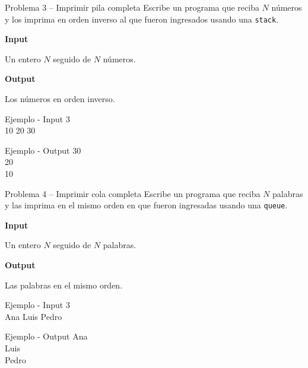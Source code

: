 \documentclass{article}
\begin{document}
\vspace{3.5em}


\begin{container}{Problema 3 – Imprimir pila completa}
Escribe un programa que reciba $N$ números y los imprima en orden inverso al que fueron ingresados usando una \texttt{stack}.
\end{container}

\textbf{Input}

Un entero $N$ seguido de $N$ números.

\vspace{0.5em}
\textbf{Output}

Los números en orden inverso.

\vspace{0.5em}

\begin{container}{Ejemplo - Input}
3 \\
10 20 30
\end{container}

\begin{container}{Ejemplo - Output}
30\\
20\\
10
\end{container}

\vspace{3.5em}


\begin{container}{Problema 4 – Imprimir cola completa}
Escribe un programa que reciba $N$ palabras y las imprima en el mismo orden en que fueron ingresadas usando una \texttt{queue}.
\end{container}

\textbf{Input}

Un entero $N$ seguido de $N$ palabras.

\vspace{0.5em}
\textbf{Output}

Las palabras en el mismo orden.

\vspace{0.5em}

\begin{container}{Ejemplo - Input}
3\\
Ana Luis Pedro
\end{container}

\begin{container}{Ejemplo - Output}
Ana\\
Luis\\
Pedro
\end{container}
\end{document}
